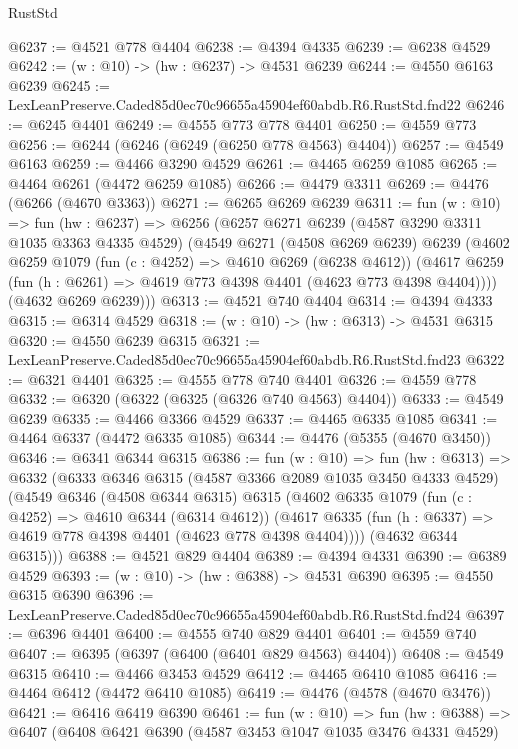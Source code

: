 \begin{lexlean}{RustStd}
\begin{coremodule}
@6237 := @4521 @778 @4404
@6238 := @4394 @4335
@6239 := @6238 @4529
@6242 := (w : @10) -> (hw : @6237) -> @4531 @6239
@6244 := @4550 @6163 @6239
@6245 := LexLeanPreserve.Caded85d0ec70c96655a45904ef60abdb.R6.RustStd.fnd22
@6246 := @6245 @4401
@6249 := @4555 @773 @778 @4401
@6250 := @4559 @773
@6256 := @6244 (@6246 (@6249 (@6250 @778 @4563) @4404))
@6257 := @4549 @6163
@6259 := @4466 @3290 @4529
@6261 := @4465 @6259 @1085
@6265 := @4464 @6261 (@4472 @6259 @1085)
@6266 := @4479 @3311
@6269 := @4476 (@6266 (@4670 @3363))
@6271 := @6265 @6269 @6239
@6311 := fun (w : @10) =>
  fun (hw : @6237) =>
  @6256
    (@6257
      @6271
      @6239
      (@4587 @3290 @3311 @1035 @3363 @4335 @4529)
      (@4549
        @6271
        (@4508 @6269 @6239)
        @6239
        (@4602
          @6259
          @1079
          (fun (c : @4252) => @4610 @6269 (@6238 @4612))
          (@4617 @6259 (fun (h : @6261) => @4619 @773 @4398 @4401 (@4623 @773 @4398 @4404))))
        (@4632 @6269 @6239)))
@6313 := @4521 @740 @4404
@6314 := @4394 @4333
@6315 := @6314 @4529
@6318 := (w : @10) -> (hw : @6313) -> @4531 @6315
@6320 := @4550 @6239 @6315
@6321 := LexLeanPreserve.Caded85d0ec70c96655a45904ef60abdb.R6.RustStd.fnd23
@6322 := @6321 @4401
@6325 := @4555 @778 @740 @4401
@6326 := @4559 @778
@6332 := @6320 (@6322 (@6325 (@6326 @740 @4563) @4404))
@6333 := @4549 @6239
@6335 := @4466 @3366 @4529
@6337 := @4465 @6335 @1085
@6341 := @4464 @6337 (@4472 @6335 @1085)
@6344 := @4476 (@5355 (@4670 @3450))
@6346 := @6341 @6344 @6315
@6386 := fun (w : @10) =>
  fun (hw : @6313) =>
  @6332
    (@6333
      @6346
      @6315
      (@4587 @3366 @2089 @1035 @3450 @4333 @4529)
      (@4549
        @6346
        (@4508 @6344 @6315)
        @6315
        (@4602
          @6335
          @1079
          (fun (c : @4252) => @4610 @6344 (@6314 @4612))
          (@4617 @6335 (fun (h : @6337) => @4619 @778 @4398 @4401 (@4623 @778 @4398 @4404))))
        (@4632 @6344 @6315)))
@6388 := @4521 @829 @4404
@6389 := @4394 @4331
@6390 := @6389 @4529
@6393 := (w : @10) -> (hw : @6388) -> @4531 @6390
@6395 := @4550 @6315 @6390
@6396 := LexLeanPreserve.Caded85d0ec70c96655a45904ef60abdb.R6.RustStd.fnd24
@6397 := @6396 @4401
@6400 := @4555 @740 @829 @4401
@6401 := @4559 @740
@6407 := @6395 (@6397 (@6400 (@6401 @829 @4563) @4404))
@6408 := @4549 @6315
@6410 := @4466 @3453 @4529
@6412 := @4465 @6410 @1085
@6416 := @4464 @6412 (@4472 @6410 @1085)
@6419 := @4476 (@4578 (@4670 @3476))
@6421 := @6416 @6419 @6390
@6461 := fun (w : @10) =>
  fun (hw : @6388) =>
  @6407
    (@6408
      @6421
      @6390
      (@4587 @3453 @1047 @1035 @3476 @4331 @4529)

\end{coremodule}
\end{lexlean}
